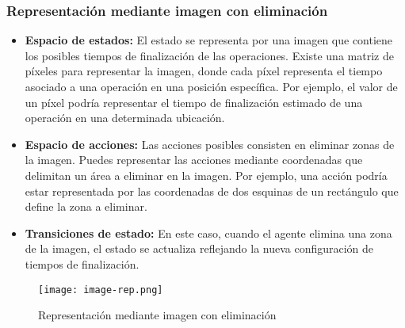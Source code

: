 \subsubsection{Representación mediante imagen con eliminación}
\begin{itemize}
    \item \textbf{Espacio de estados:} El estado se representa por una imagen que contiene 
    los posibles tiempos de finalización de las operaciones. Existe una matriz de píxeles 
    para representar la imagen, donde cada píxel representa el tiempo asociado a una operación 
    en una posición específica. Por ejemplo, el valor de un píxel podría representar el tiempo 
    de finalización estimado de una operación en una determinada ubicación.
    \item \textbf{Espacio de acciones:} Las acciones posibles consisten en eliminar zonas de 
    la imagen. Puedes representar las acciones mediante coordenadas que delimitan un área a 
    eliminar en la imagen. Por ejemplo, una acción podría estar representada por las 
    coordenadas de dos esquinas de un rectángulo que define la zona a eliminar.
    \item \textbf{Transiciones de estado:} En este caso, cuando el agente elimina una zona de 
    la imagen, el estado se actualiza reflejando la nueva configuración de tiempos de finalización. 
\end{itemize}
\begin{figure}[ht]
    \centering
    \texttt{[image: image-rep.png]}
    \caption{Representación mediante imagen con eliminación}
    \label{fig:image-rep}
\end{figure}
